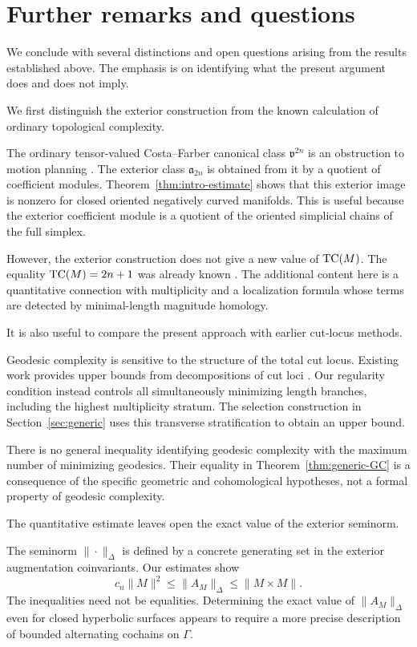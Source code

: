 \section{Further remarks and questions}
\label{sec:remarks}

We conclude with several distinctions and open questions
arising from the results established above. The emphasis
is on identifying what the present argument does and does
not imply.

We first distinguish the exterior construction from the known calculation of ordinary topological complexity.

The ordinary tensor-valued Costa--Farber canonical class
$\mathfrak v^{2n}$ is an obstruction to motion planning
\cite{CostaFarber2010}. The exterior class
$\mathfrak a_{2n}$ is obtained from it by a quotient of
coefficient modules. Theorem~\ref{thm:intro-estimate}
shows that this exterior image is nonzero for closed
oriented negatively curved manifolds. This is useful
because the exterior coefficient module is a quotient
of the oriented simplicial chains of the full simplex.

However, the exterior construction does not give a
new value of $\text{TC}(M)$. The equality $\text{TC}(M)=2n+1$
was already known \cite{Dranishnikov2020}.
The additional content here is a quantitative
connection with multiplicity and a localization
formula whose terms are detected by
minimal-length magnitude homology.

It is also useful to compare the present approach with earlier cut-locus methods.

Geodesic complexity is sensitive to the structure
of the total cut locus. Existing work provides
upper bounds from decompositions of cut loci
\cite{RecioMitter2021,MescherStegemeyer2023}.
Our regularity condition instead controls all
simultaneously minimizing length branches,
including the highest multiplicity stratum.
The selection construction in
Section~\ref{sec:generic} uses this transverse
stratification to obtain an upper bound.

There is no general inequality identifying
geodesic complexity with the maximum number
of minimizing geodesics. Their equality in
Theorem~\ref{thm:generic-GC} is a consequence
of the specific geometric and cohomological
hypotheses, not a formal property of
geodesic complexity.

The quantitative estimate leaves open the exact value of the exterior seminorm.

The seminorm $\|\cdot\|_\Delta$ is defined
by a concrete generating set in the
exterior augmentation coinvariants.
Our estimates show
\[
 c_n\|M\|^2
 \leq\|A_M\|_\Delta
 \leq\|M\times M\|.
\]
The inequalities need not be equalities.
Determining the exact value of
$\|A_M\|_\Delta$ even for closed hyperbolic
surfaces appears to require a more precise
description of bounded alternating
cochains on $\Gamma$.

